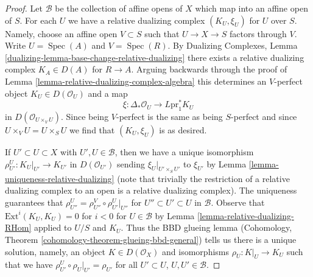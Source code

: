 \documentclass{stacks-project}
\theoremstyle{plain}
\theoremstyle{definition}
\theoremstyle{remark}
\numberwithin{equation}{subsection}
\def\Spec{\mathop{\mathrm{Spec}}}
\begin{document}
\begin{proof}
Let $\mathcal{B}$ be the collection of affine opens of
$X$ which map into an affine open of $S$. For each $U$
we have a relative dualizing complex $(K_U, \xi_U)$ for
$U$ over $S$. Namely, choose an affine open
$V \subset S$ such that $U \to X \to S$ factors through $V$.
Write $U = \Spec(A)$ and $V = \Spec(R)$. By
Dualizing Complexes, Lemma \ref{dualizing-lemma-base-change-relative-dualizing}
there exists a relative dualizing complex $K_A \in D(A)$
for $R \to A$. Arguing backwards through the proof of
Lemma \ref{lemma-relative-dualizing-complex-algebra}
this determines an $V$-perfect object $K_U \in D(\mathcal{O}_U)$
and a map
$$
\xi : \Delta_*\mathcal{O}_U \to L\text{pr}_1^*K_U
$$
in $D(\mathcal{O}_{U \times_V U})$. Since being $V$-perfect is the
same as being $S$-perfect and since $U \times_V U = U \times_S U$
we find that $(K_U, \xi_U)$ is as desired.

\medskip\noindent
If $U' \subset U \subset X$ with $U', U \in \mathcal{B}$, then
we have a unique isomorphism $\rho_{U'}^U : K_U|_{U'} \to K_{U'}$
in $D(\mathcal{O}_{U'})$ sending $\xi_U|_{U' \times_S U'}$
to $\xi_{U'}$ by Lemma \ref{lemma-uniqueness-relative-dualizing}
(note that trivially the restriction of a relative dualizing
complex to an open is a relative dualizing complex).
The uniqueness guarantees that
$\rho^U_{U''} = \rho^V_{U''} \circ \rho ^U_{U'}|_{U''}$
for $U'' \subset U' \subset U$ in $\mathcal{B}$.
Observe that $\text{Ext}^i(K_U, K_U) = 0$ for $i < 0$
for $U \in \mathcal{B}$ by Lemma \ref{lemma-relative-dualizing-RHom}
applied to $U/S$ and $K_U$.
Thus the BBD glueing lemma
(Cohomology, Theorem \ref{cohomology-theorem-glueing-bbd-general})
tells us there is a unique solution, namely, an object
$K \in D(\mathcal{O}_X)$ and isomorphisms $\rho_U : K|_U \to K_U$
such that we have
$\rho^U_{U'} \circ \rho_U|_{U'} = \rho_{U'}$ for all $U' \subset U$,
$U, U' \in \mathcal{B}$.


\end{proof}
\end{document}

